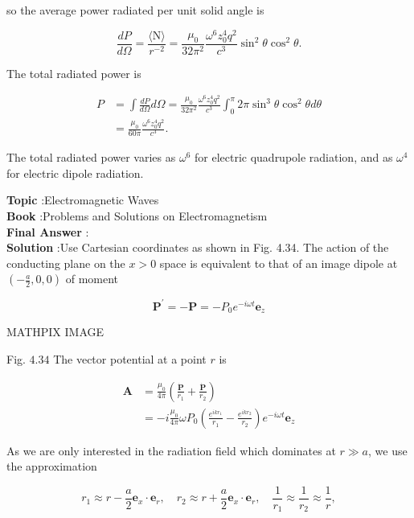 \documentclass[10pt]{article}
\begin{document}
so the average power radiated per unit solid angle is

$$
\frac{d P}{d \Omega}=\frac{\langle\mathrm{N}\rangle}{r^{-2}}=\frac{\mu_{0}}{32 \pi^{2}} \frac{\omega^{6} z_{0}^{4} q^{2}}{c^{3}} \sin ^{2} \theta \cos ^{2} \theta .
$$

 The total radiated power is

$$
\begin{aligned}
P &=\int \frac{d P}{d \Omega} d \Omega=\frac{\mu_{0}}{32 \pi^{2}} \frac{\omega^{6} z_{0}^{4} q^{2}}{c^{3}} \int_{0}^{\pi} 2 \pi \sin ^{3} \theta \cos ^{2} \theta d \theta \\
&=\frac{\mu_{0}}{60 \pi} \frac{\omega^{6} z_{0}^{4} q^{2}}{c^{3}} .
\end{aligned}
$$

The total radiated power varies as $\omega^{6}$ for electric quadrupole radiation, and as $\omega^{4}$ for electric dipole radiation.

\textbf{Topic} :Electromagnetic Waves\\
\textbf{Book} :Problems and Solutions on Electromagnetism\\
\textbf{Final Answer} : \\


\textbf{Solution} :Use Cartesian coordinates as shown in Fig. 4.34. The action of the conducting plane on the $x>0$ space is equivalent to that of an image dipole at $\left(-\frac{a}{2}, 0,0\right)$ of moment

$$
\mathbf{P}^{\prime}=-\mathbf{P}=-P_{0} e^{-i \omega t} \mathbf{e}_{z}
$$

MATHPIX IMAGE

Fig. $4.34$ The vector potential at a point $r$ is

$$
\begin{aligned}
\mathbf{A} &=\frac{\mu_{0}}{4 \pi}\left(\frac{\dot{\mathbf{P}}}{r_{1}}+\frac{\dot{\mathbf{P}}}{r_{2}}\right) \\
&=-i \frac{\mu_{0}}{4 \pi} \omega P_{0}\left(\frac{e^{i k r_{1}}}{r_{1}}-\frac{e^{i k r_{2}}}{r_{2}}\right) e^{-i \omega t} \mathbf{e}_{z}
\end{aligned}
$$

As we are only interested in the radiation field which dominates at $r \gg a$, we use the approximation

$$
r_{1} \approx r-\frac{a}{2} \mathbf{e}_{x} \cdot \mathbf{e}_{r}, \quad r_{2} \approx r+\frac{a}{2} \mathbf{e}_{x} \cdot \mathbf{e}_{r}, \quad \frac{1}{r_{1}} \approx \frac{1}{r_{2}} \approx \frac{1}{r},
$$
\end{document}

